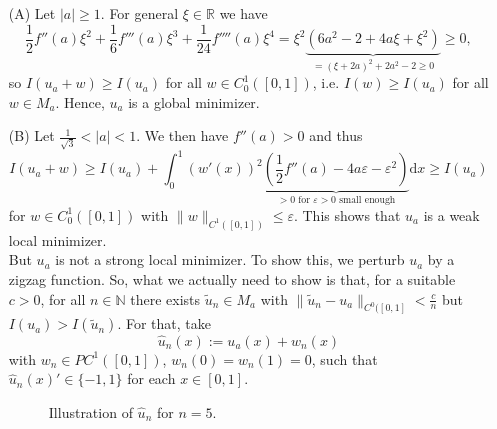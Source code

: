 \begin{itemize}
	\item[(A)] Let $\lvert a\rvert\geq1$. For general $\xi\in\mathbb{R}$ we have
	\[\frac{1}{2}f''(a)\xi^2+\frac{1}{6}f'''(a)\xi^3+\frac{1}{24}f''''(a)\xi^4=\xi^2\underbrace{(6a^2-2+4a\xi+\xi^2)}_{=(\xi+2a)^2+2a^2-2\geq0}\geq0,\]
	so $I(u_a+w)\geq I(u_a)$ for all $w\in C_0^1([0,1])$, i.e. $I(w)\geq I(u_a)$ for all $w\in M_a$. Hence, $u_a$ is a global minimizer.
	\item[(B)] Let $\frac{1}{\sqrt{3}}<\lvert a\rvert<1$. We then have $f''(a)>0$ and thus
	\[I(u_a+w)\geq I(u_a)+\int_0^1{(w'(x))^2\underbrace{\left(\frac{1}{2}f''(a)-4a\varepsilon-\varepsilon^2\right)}_{>0\text{ for }\varepsilon>0\text{ small enough}}\mathrm{d}x}\geq I(u_a)\]
	for $w\in C_0^1([0,1])$ with $\lVert w\rVert_{C^1([0,1])}\leq\varepsilon$. This shows that $u_a$ is a weak local minimizer.\\

	But $u_a$ is not a strong local minimizer. To show this, we perturb $u_a$ by a zigzag function. So, what we actually need to show is that, for a suitable $c>0$, for all $n\in\mathbb{N}$ there exists $\widetilde{u}_n\in M_a$ with $\lVert\widetilde{u}_n-u_a\rVert_{C^0([0,1]}<\frac{c}{n}$ but $I(u_a)>I(\widetilde{u}_n)$. For that, take
	\[\hat{u}_n(x):=u_a(x)+w_n(x)\]
	with $w_n\in PC^1([0,1])$, $w_n(0)=w_n(1)=0$, such that $\hat{u}_n(x)'\in\{-1,1\}$ for each $x\in[0,1]$.\\

	\begin{figure}[ht]
		\centering
		\caption{Illustration of $\hat{u}_n$ for $n=5$.}
	\end{figure}


\end{itemize}
